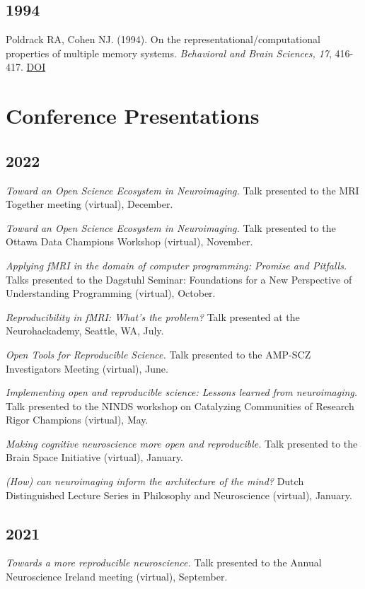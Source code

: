 \documentclass[10pt, letterpaper]{article}
\begin{document}
\subsection*{1994}Poldrack RA, Cohen NJ.  (1994). On the representational/computational properties of multiple memory systems. \textit{Behavioral and Brain Sciences, 17}, 416-417. \href{https://doi.org/10.1017/s0140525x00035275}{DOI} \vspace{2mm}


\section*{Conference Presentations}
\noindent
\subsection*{2022}\textit{Toward an Open Science Ecosystem in Neuroimaging.}  Talk presented to the MRI Together meeting (virtual), December.

\textit{Toward an Open Science Ecosystem in Neuroimaging.}  Talk presented to the Ottawa Data Champions Workshop (virtual), November.

\textit{Applying fMRI in the domain of computer programming:  Promise and Pitfalls.} Talks presented to the Dagstuhl Seminar: Foundations for a New Perspective of Understanding Programming (virtual), October.

\textit{Reproducibility in fMRI: What's the problem?} Talk presented at the Neurohackademy, Seattle, WA, July.

\textit{Open Tools for Reproducible Science.} Talk presented to the AMP-SCZ Investigators Meeting (virtual), June.

\textit{Implementing open and reproducible science: Lessons learned from neuroimaging.} Talk presented to the NINDS workshop on Catalyzing Communities of Research Rigor Champions (virtual), May.

\textit{Making cognitive neuroscience more open and reproducible.} Talk presented to the Brain Space Initiative (virtual), January.

\textit{(How) can neuroimaging inform the architecture of the mind?} Dutch Distinguished Lecture Series in Philosophy and Neuroscience (virtual), January.

\subsection*{2021}\textit{Towards a more reproducible neuroscience.} Talk presented to the Annual Neuroscience Ireland meeting (virtual), September.
\end{document}
